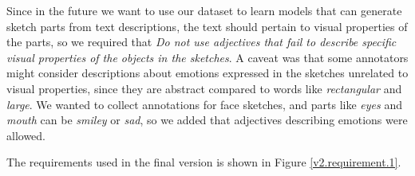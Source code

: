 Since in the future we want to use our dataset to learn models that can generate sketch parts from text descriptions, the text should pertain to visual properties of the parts, so we required that \textit{Do not use adjectives that fail to describe specific visual properties of the objects in the sketches}. 
A caveat was that some annotators might consider descriptions about emotions expressed in the sketches unrelated to visual properties, since they are abstract compared to words like \textit{rectangular} and \textit{large}. 
We wanted to collect annotations for face sketches, and parts like \textit{eyes} and \textit{mouth} can be \textit{smiley} or \textit{sad}, so we added that adjectives describing emotions were allowed. 

The requirements used in the final version is shown in Figure \ref{v2.requirement.1}.



% 